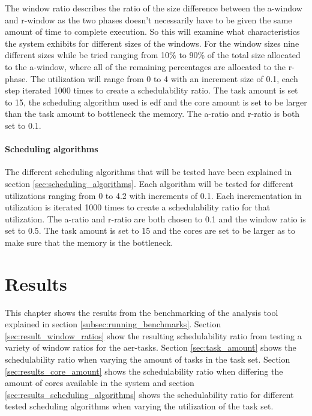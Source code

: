 \documentclass{kththesis}
\begin{document}
The window ratio describes the ratio of the size difference between the \acrshort{a}-window and
\acrshort{r}-window as the two phases doesn't necessarily have to be given the same amount of time
to complete execution. So this will examine what characteristics the system exhibits for different
sizes of the windows. For the window sizes nine different sizes while be tried ranging from 10\% to 90\% of the
total size allocated to the \acrshort{a}-window, where all of the remaining percentages are
allocated to the \acrshort{r}-phase. The utilization will range from 0 to 4 with an increment size
of 0.1, each step iterated 1000 times to create a schedulability ratio. The task amount is set to
15, the scheduling algorithm used is \acrshort{edf} and the core amount is set to be larger than
the task amount to bottleneck the memory. The \acrshort{a}-ratio and \acrshort{r}-ratio is both set
to 0.1.

\subsubsection{Scheduling algorithms}

The different scheduling algorithms that will be tested have been explained in section
\ref{sec:scheduling_algorithms}. Each algorithm will be tested for different utilizations ranging
from 0 to 4.2 with increments of 0.1. Each incrementation in utilization is iterated 1000 times to
create a schedulability ratio for that utilization. The \acrshort{a}-ratio and \acrshort{r}-ratio
are both chosen to 0.1 and the window ratio is set to 0.5. The task amount is set to 15 and the
cores are set to be larger as to make sure that the memory is the bottleneck.


\chapter{Results} \label{ch:results}

This chapter shows the results from the benchmarking of the analysis tool explained in section
\ref{subsec:running_benchmarks}. Section \ref{sec:result_window_ratios} show the resulting
schedulability ratio from testing a variety of window ratios for the \acrshort{aer}-tasks. Section
\ref{sec:task_amount} shows the schedulability ratio when varying the amount of tasks in the task
set. Section \ref{sec:results_core_amount} shows the schedulability ratio when differing the amount of cores
available in the system and section \ref{sec:results_scheduling_algorithms} shows the schedulability
ratio for different tested scheduling algorithms when varying the utilization of the task set.
\end{document}
